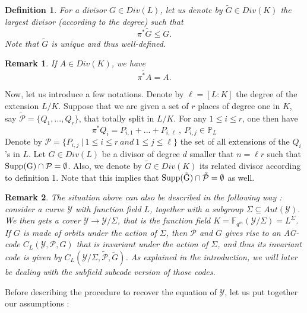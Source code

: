 \documentclass[10pt]{article}
\newtheorem{def1}{Definition}[]
\newtheorem{rq1}{Remark}[]
\newcommand{\s}{\vspace{0.3cm}}
\newcommand{\fqm}{\mathbb{F}_{q^m}}
\newcommand{\su}{\subseteq}
\newcommand{\Y}{\mathcal{Y}}
\newcommand{\PR}{\mathcal{P}}
\begin{document}
\s

\begin{def1}
For a divisor $G \in Div(L)$, let us denote by $\tilde{G} \in Div(K)$ the largest divisor (according to the degree) such that
\[\pi^*\tilde{G} \leq G.\]
Note that $\tilde{G}$ is unique and thus well-defined.
\end{def1} 

\s 

\begin{rq1}
If $A \in Div(K)$, we have 
\[\widetilde{\pi^*A}=A.\]
\end{rq1}

\s

Now, let us introduce a few notations. Denote by $\ell=[L:K]$ the degree of the extension $L/K$. Suppose that we are given a set of $r$ places of degree one in $K$, say $\tilde{\PR} = \{Q_1,...,Q_r\}$, that totally split in $L/K$. For any $1 \leq i \leq r$, one then have 
\[\pi^*Q_i = P_{i,1} + ... + P_{i,\ell} \ , \ P_{i,j} \in \mathbb{P}_L\]
Denote by $\PR = \{P_{i,j} \ | \ 1 \leq i \leq r \ and \ 1 \leq j \leq \ell\}$ the set of all extensions of the $Q_i$'s in $L$. Let $G \in Div(L)$ be a divisor of degree $d$ smaller that $n=\ell r$ such that $\rm{Supp}(G) \cap \PR = \emptyset$. Also, we denote by $\tilde{G} \in Div(K)$ its related divisor according to definition 1.
Note that this implies that $\rm{Supp}(\tilde{G}) \cap \tilde{\PR} = \emptyset$ as well. 

\s

\begin{rq1} \rm
The situation above can also be described in the following way : consider a curve $\Y$ with function field $L$, together with a subgroup $\Sigma \su Aut(\Y)$. We then gets a cover $\Y \rightarrow \Y/\Sigma$, that is the function field $K = \fqm(\Y/\Sigma) = L^{\Sigma}$. If $G$ is made of orbits under the action of $\Sigma$, then $\PR$ and $G$ gives rise to an AG-code $C_L(\Y,\PR,G)$ that is invariant under the action of $\Sigma$, and thus its invariant code is given by $C_L(\Y/\Sigma,\tilde{\PR},\tilde{G})$. As explained in the introduction, we will later be dealing with the subfield subcode version of those codes.  
\end{rq1}

\s

Before describing the procedure to recover the equation of $\Y$, let us put together our assumptions :
\end{document}
